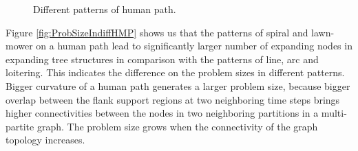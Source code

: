 \begin{figure}[H] 
  \centering 
  \caption{Different patterns of human path.} 
  \label{fig:diffHMP} %
\end{figure}

Figure \ref{fig:ProbSizeIndiffHMP} shows us that the patterns of spiral and lawn-mower on a human path lead to significantly larger number of expanding nodes in expanding tree structures in comparison with the patterns of line, arc and loitering.
This indicates the difference on the problem sizes in different patterns.
Bigger curvature of a human path generates a larger problem size, because bigger overlap between the flank support regions at two neighboring time steps brings higher connectivities between the nodes in two neighboring partitions in a multi-partite graph.
The problem size grows when the connectivity of the graph topology increases.

